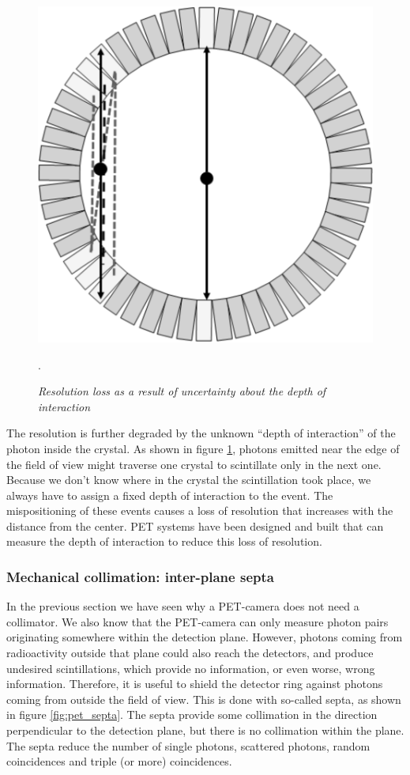 \begin{figure}[tb]
\centering
\includegraphics[width=\figsmall]{figs/fig_doi.pdf}
\caption{\label{fig:doi} \emph{Resolution loss as a result of
    uncertainty about the depth of interaction}}.
\end{figure}
%
The resolution is further degraded by the unknown ``depth of
interaction'' of the photon inside the crystal. As shown in figure
\ref{fig:doi}, photons emitted near the edge of the field of view
might traverse one crystal to scintillate only in the next
one. Because we don't know where in the crystal the scintillation took
place, we always have to assign a fixed depth of interaction to the
event. The mispositioning of these events causes a loss of resolution
that increases with the distance from the center. PET systems have
been designed and built that can measure the depth of interaction to
reduce this loss of resolution.


\subsubsection{Mechanical collimation: inter-plane septa \label{sec:septa}}
In the previous section we have seen why a PET-camera does not need a
collimator. We also know that the PET-camera can only measure photon pairs
originating somewhere within the detection plane. However, photons coming from
radioactivity outside that plane could also reach the detectors, and produce
undesired scintillations, which provide no information, or even worse, wrong
information. Therefore, it is useful to shield the detector ring against
photons coming from outside the field of view. This is done with so-called
septa, as shown in figure \ref{fig:pet_septa}. The septa provide some
collimation in the direction perpendicular to the detection plane, but there is
no collimation within the plane. The septa reduce the number of single
photons, scattered photons, random coincidences and triple (or more)
coincidences.

